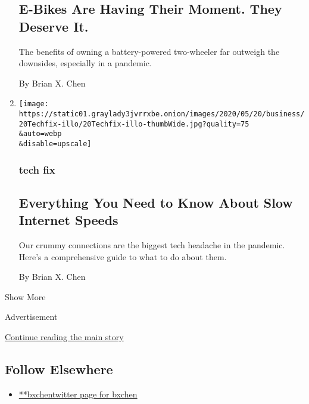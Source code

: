\begin{enumerate}
  \hypertarget{e-bikes-are-having-their-moment-they-deserve-it}{%
  \subsection{E-Bikes Are Having Their Moment. They Deserve
  It.}\label{e-bikes-are-having-their-moment-they-deserve-it}}

  The benefits of owning a battery-powered two-wheeler far outweigh the
  downsides, especially in a pandemic.

  By Brian X. Chen
\item
  \href{/2020/05/20/technology/personaltech/slow-internet-speeds.html}{}

  \texttt{[image: https://static01.graylady3jvrrxbe.onion/images/2020/05/20/business/20Techfix-illo/20Techfix-illo-thumbWide.jpg?quality=75\\\&auto=webp\\\&disable=upscale]}

  \hypertarget{tech-fix-7}{%
  \subsubsection{tech fix}\label{tech-fix-7}}

  \hypertarget{everything-you-need-to-know-about-slow-internet-speeds}{%
  \subsection{Everything You Need to Know About Slow Internet
  Speeds}\label{everything-you-need-to-know-about-slow-internet-speeds}}

  Our crummy connections are the biggest tech headache in the pandemic.
  Here's a comprehensive guide to what to do about them.

  By Brian X. Chen
\end{enumerate}

Show More

Advertisement

\protect\hyperlink{after-mid2}{Continue reading the main story}

\hypertarget{follow-elsewhere}{%
\subsection{Follow Elsewhere}\label{follow-elsewhere}}

\begin{itemize}
\tightlist
\item
  \href{https://twitter.com/bxchen}{**bxchentwitter page for bxchen}
\end{itemize}

